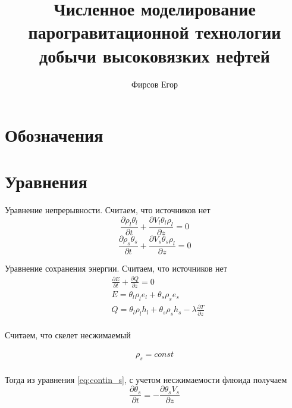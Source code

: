 \documentclass[12pt]{article}
\title{Численное моделирование парогравитационной технологии добычи высоковязких нефтей}
\author{Фирсов Егор}
\newcommand{\pd}[2]{\frac{\partial #1}{\partial #2}}
\begin{document}
\maketitle
\newpage
\section*{Обозначения}

\section*{Уравнения}

Уравнение непрерывности. Считаем, что источников нет
\begin{equation}
\pd{\rho_l\theta_l}{t} + \pd{V_l\theta_l\rho_l}{z} =0
\label{eq:contin_l}
\end{equation}
\begin{equation}
\pd{\rho_s\theta_s}{t} + \pd{V_s\theta_s\rho_l}{z} =0
\label{eq:contin_s}
\end{equation}

Уравнение сохранения энергии. Считаем, что источников нет
\begin{equation}
\begin{aligned}
&\pd{E}{t} + \pd{Q}{z} =0 \\
&E=\theta_l\rho_l e_l + \theta_s\rho_s e_s \\
&Q=\theta_l\rho_l h_l + \theta_s\rho_s h_s - \lambda \pd{T}{z}\\
\label{eq:conserv}
\end{aligned}
\end{equation}

Считаем, что скелет несжимаемый

\begin{equation}
\begin{aligned}
\rho_s = const \\
\label{rho_const}
\end{aligned}
\end{equation}

Тогда из уравнения \eqref{eq:contin_s}, с учетом несжимаемости флюида получаем
\begin{equation}
\pd{\theta_s}{t} = - \pd{\theta_s V_s}{z}
\label{fluid}
\end{equation}
\end{document}
